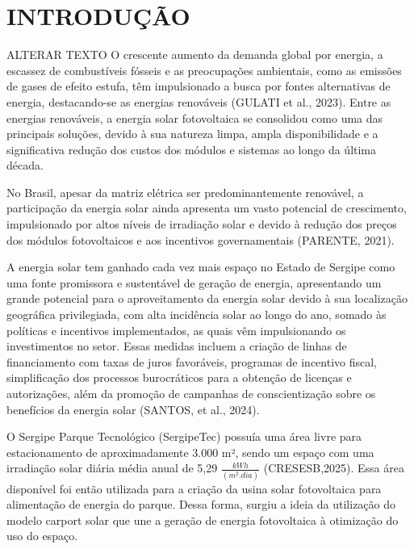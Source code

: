 \renewcommand{\chaptername}{} %

\chapter{INTRODUÇÃO}


\label{cap:intro}

ALTERAR TEXTO
O crescente aumento da demanda global por energia, a escassez de combustíveis fósseis e as preocupações ambientais, como as emissões de gases de efeito estufa, têm impulsionado a busca por fontes alternativas de energia, destacando-se as energias renováveis (GULATI et al., 2023). Entre as energias renováveis, a energia solar fotovoltaica se consolidou como uma das principais soluções, devido à sua natureza limpa, ampla disponibilidade e a significativa redução dos custos dos módulos e sistemas ao longo da última década. 

No Brasil, apesar da matriz elétrica ser predominantemente renovável, a participação da energia solar ainda apresenta um vasto potencial de crescimento, impulsionado por altos níveis de irradiação solar e devido à redução dos preços dos módulos fotovoltaicos e aos incentivos governamentais (PARENTE, 2021). 


A energia solar tem ganhado cada vez mais espaço no Estado de Sergipe como uma fonte promissora e sustentável de geração de energia, apresentando um grande potencial para o aproveitamento da energia solar devido à sua localização geográfica privilegiada, com alta incidência solar ao longo do ano, somado às políticas e incentivos implementados,  as quais vêm impulsionando os investimentos no setor. Essas medidas incluem a criação de linhas de financiamento com taxas de juros favoráveis, programas de incentivo fiscal, simplificação dos processos burocráticos para a obtenção de licenças e autorizações, além da promoção de campanhas de conscientização sobre os benefícios da energia solar (SANTOS, et al., 2024). 
 

O Sergipe Parque Tecnológico (SergipeTec) possuía uma área livre para estacionamento de aproximadamente 3.000 m², sendo um espaço com uma irradiação solar diária média anual de 5,29 $\frac{kWh}{(m^2.  dia)}$  (CRESESB,2025). Essa área disponível foi então utilizada para a criação da usina solar fotovoltaica para alimentação de energia do parque. Dessa forma, surgiu a ideia da utilização do modelo carport solar que une a geração de energia fotovoltaica à otimização do uso do espaço. 


